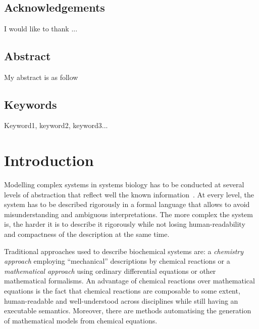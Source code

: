 \documentclass[11pt,a4paper]{report}
\newcounter{counter}[section]
\begin{document}


\pagestyle{plain}

~\vfill

\section*{Acknowledgements}
I would like to thank ...


\newpage
\section*{Abstract}
My abstract is as follow

\newpage
\section*{Keywords}
Keyword1, keyword2, keyword3...

\tableofcontents
\newpage

\setcounter{page}{0}


\chapter{Introduction} \label{chap:intro}

Modelling complex systems in systems biology has to be conducted at several levels of abstraction that reflect well the known information~\cite{Kitano}. At every level, the system has to be described rigorously in a formal language that allows to avoid
misunderstanding and ambiguous interpretations. The more complex the system is, the harder it is to describe it rigorously while not losing human-readability and compactness of the description at the same time.

Traditional approaches used to describe biochemical systems are: a \emph{chemistry approach} employing ``mechanical'' descriptions by chemical reactions or a \emph{mathematical approach} using ordinary differential equations or other mathematical formalisms. An advantage of chemical reactions over mathematical equations is the fact that chemical reactions are composable to some extent, human-readable and well-understood across disciplines while still having an executable semantics. 
Moreover, there are methods automatising the generation of mathematical models from chemical equations.
\end{document}
